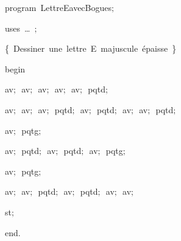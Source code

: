 
{
\parindent {}
\medskip

\carrenoir
\vspace{\neglskip}\mbox{\blc  \idt  \mcl program\idt \ LettreEavecBogues$;$
}\par 
\vspace{\neglskip}\mbox{\blc \blk\idt \mcl uses\idt \ \ldots\ $;$
}\par 
\medskip

\vspace{\neglskip}\mbox{\blc  \blk\idt  \cmt  \{\ Dessiner\ une\ lettre\ E\ majuscule\ épaisse\ \}\idt }\par 
\medskip

\vspace{\neglskip}\mbox{\blc  \idt  \mcl begin\idt }\par 
\vspace{\neglskip}\mbox{\blc  \blk\idt  av$;$\ av$;$\ av$;$\ av$;$\ av$;$\ pqtd$;$}\par 
\vspace{\neglskip}\mbox{\blc  \blk\idt  av$;$\ av$;$\ av$;$\ pqtd$;$\ av$;$\ pqtd$;$\ av$;$\ av$;$\ pqtd$;$}\par 
\vspace{\neglskip}\mbox{\blc  \blk\idt  av$;$\ pqtg$;$}\par 
\vspace{\neglskip}\mbox{\blc  \blk\idt  av$;$\ pqtd$;$\ av$;$\ pqtd$;$\ av$;$\ pqtg$;$}\par 
\vspace{\neglskip}\mbox{\blc  \blk\idt  av$;$\ pqtg$;$}\par 
\vspace{\neglskip}\mbox{\blc  \blk\idt  av$;$\ av$;$\ pqtd$;$\ av$;$\ pqtd$;$\ av$;$\ av$;$}\par 
\vspace{\neglskip}\mbox{\blc  \blk\idt  st$;$}\par 
\vspace{\neglskip}\mbox{\blc  \idt  \mcl end\idt $.$}\par 
\medskip


\medskip }

